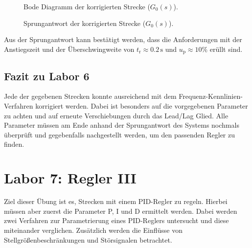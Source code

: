 \documentclass[11pt,a4paper]{article}
\newlength\figureheight
\newlength\figurewidth
\begin{document}
\begin{figure}[H]
    \centering
    \setlength\figureheight{6cm}
    \setlength{} %
    
    
    
    \caption{Bode Diagramm der korrigierten Strecke ($G_{\mathrm{0}}(s)$).}
    \label{fig:matlab_plot19}

\end{figure}

\begin{figure}[H]
    \centering
    \setlength\figureheight{6cm}
    \setlength{} %
    
    
    
    \caption{Sprungantwort der korrigierten Strecke ($G_{\mathrm{0}}(s)$).}
    \label{fig:matlab_plot20}

\end{figure}

\noindent Aus der Sprungantwort kann bestätigt werden, dass die Anforderungen mit der Anstiegszeit und der Überschwingweite von $t_{\mathrm{r}} \approx 0.2\,\text{s}$ und $u_{\mathrm{p}} \approx 10\%$ erüllt sind.

\newpage
\subsection{Fazit zu Labor 6}
Jede der gegebenen Strecken konnte ausreichend mit dem Frequenz-Kennlinien-Verfahren korrigiert werden. Dabei ist besonders auf die vorgegebenen Parameter zu achten und auf erneute Verschiebungen durch das Lead/Lag Glied. Alle Parameter müssen am Ende anhand der Sprungantwort des Systems nochmals überprüft und gegebenfalls nachgestellt werden, um den passenden Regler zu finden.

\newpage

\section{Labor 7: Regler III}

Ziel dieser Übung ist es, Strecken mit einem PID-Regler zu regeln. Hierbei müssen aber zuerst die Parameter P, I und D ermittelt werden. Dabei werden zwei Verfahren zur Parametrierung eines PID-Reglers untersucht und diese miteinander verglichen. Zusätzlich werden die Einflüsse von Stellgrößenbeschränkungen und Störsignalen betrachtet.
\end{document}
